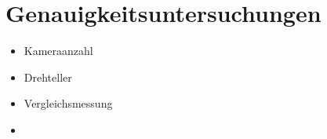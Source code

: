 \documentclass[./00PhotoBox.tex]{subfiles}
\begin{document}
\chapter{Genauigkeitsuntersuchungen}

\begin{itemize}
    \item Kameraanzahl
    \item Drehteller
    \item Vergleichsmessung
    \item
\end{itemize}

\biblio
\end{document}
